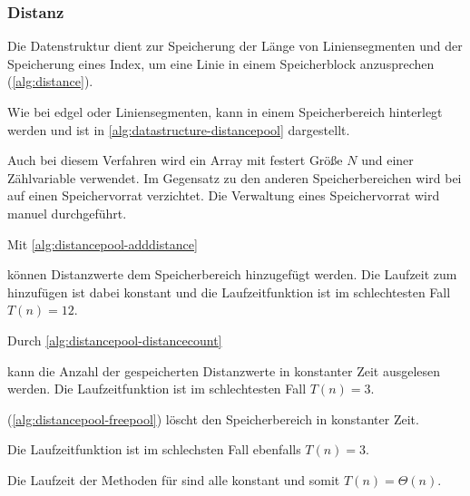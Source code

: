 \subsubsection{Distanz} %
\label{sub:distanz}

Die Datenstruktur  dient zur Speicherung der Länge von Liniensegmenten und der Speicherung eines
 Index, um eine Linie in einem Speicherblock anzusprechen (\autoref{alg:distance}).


Wie bei \gls{edgel} oder Liniensegmenten, kann  in einem Speicherbereich hinterlegt werden und ist
 in \autoref{alg:datastructure-distancepool} dargestellt.

Auch bei diesem Verfahren wird ein Array mit festert Größe $N$ und einer Zählvariable verwendet. Im Gegensatz zu den
 anderen Speicherbereichen wird bei  auf einen Speichervorrat verzichtet. Die Verwaltung eines
 Speichervorrat wird manuel durchgeführt.

% 
% 

Mit \autoref{alg:distancepool-adddistance}

können Distanzwerte dem Speicherbereich hinzugefügt werden. Die Laufzeit zum hinzufügen ist dabei konstant und die
 Laufzeitfunktion ist im schlechtesten Fall $T(n) = 12$.

Durch \autoref{alg:distancepool-distancecount}

 kann die Anzahl der gespeicherten Distanzwerte in konstanter Zeit ausgelesen werden. Die Laufzeitfunktion ist im schlechtesten Fall $T(n) = 3$.

 (\autoref{alg:distancepool-freepool}) löscht den Speicherbereich in konstanter Zeit.

Die Laufzeitfunktion ist im schlechsten Fall ebenfalls $T(n) = 3$.

Die Laufzeit der Methoden für  sind alle konstant und somit $T(n)=\Theta(n)$.

